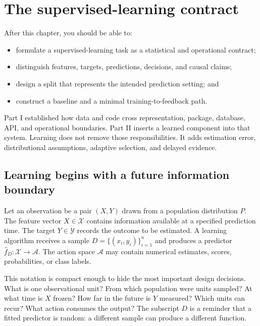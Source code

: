 \chapter{The supervised-learning contract}
\label{ch:supervised-contract}

\begin{learningobjectives}
After this chapter, you should be able to:
\begin{itemize}
  \item formulate a supervised-learning task as a statistical and operational contract;
  \item distinguish features, targets, predictions, decisions, and causal claims;
  \item design a split that represents the intended prediction setting; and
  \item construct a baseline and a minimal training-to-feedback path.
\end{itemize}
\end{learningobjectives}

\begin{chapterconnection}
Part I established how data and code cross representation, package, database,
API, and operational boundaries. Part II inserts a learned component into that
system. Learning does not remove those responsibilities. It adds estimation
error, distributional assumptions, adaptive selection, and delayed evidence.
\end{chapterconnection}

\section{Learning begins with a future information boundary}

Let an observation be a pair $(X,Y)$ drawn from a population distribution
$P$. The feature vector $X\in\mathcal{X}$ contains information available at a
specified prediction time. The target $Y\in\mathcal{Y}$ records the outcome to
be estimated. A learning algorithm receives a sample
$D=\{(x_i,y_i)\}_{i=1}^n$ and produces a predictor
$\widehat f_D:\mathcal{X}\rightarrow\mathcal{A}$. The action space
$\mathcal{A}$ may contain numerical estimates, scores, probabilities, or class
labels.

This notation is compact enough to hide the most important design decisions.
What is one observational unit? From which population were units sampled? At
what time is $X$ frozen? How far in the future is $Y$ measured? Which units can
recur? What action consumes the output? The subscript $D$ is a reminder that a
fitted predictor is random: a different sample can produce a different
function.

